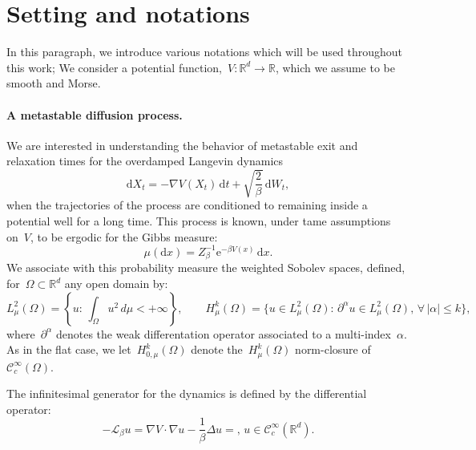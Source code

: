 \documentclass[10pt]{article}
\newcommand{\cL}{\mathcal{L}}
\renewcommand{\d}{\mathrm{d}}
\newcommand{\e}{\mathrm{e}}
\newcommand{\R}{\mathbb{R}}
\newcommand{\1}{\mathbbm 1}
\begin{document}
    \section{Setting and notations}
    \label{sec:notations}
    In this paragraph, we introduce various notations which will be used throughout this work;
    We consider a potential function,~$V:\R^d \to \R$, which we assume to be smooth and Morse.

    \paragraph{A metastable diffusion process.}
    We are interested in understanding the behavior of metastable exit and relaxation times for the overdamped Langevin dynamics
    \begin{equation}
        \label{eq:overdamped_langevin}
        \d X_t = -\nabla V(X_t)\,\d t + \sqrt{\frac2\beta}\, \d W_t,
    \end{equation}
    when the trajectories of the process are conditioned to remaining inside a potential well for a long time.
    This process is known, under tame assumptions on~$V$, to be ergodic for the Gibbs measure:
    \[\mu(\d x) = Z_\beta^{-1}\e^{-\beta V(x)}\,\d x.\]
    We associate with this probability measure the weighted Sobolev spaces, defined, for~$\Omega\subset \R^d$ any open domain by:
    \begin{equation}
        \label{eq:sobolev_spaces}
        L_\mu^2(\Omega) = \left\{u:\,\int_{\Omega} u^2 \,d\mu < +\infty\right\},\qquad H^{k}_\mu(\Omega) = \{u\in L^2_\mu(\Omega):\,\partial^{\alpha}u\in L^2_\mu(\Omega),\,\forall\, |\alpha|\leq k\},
    \end{equation}
    where~$\partial^\alpha$ denotes the weak differentation operator associated to a multi-index~$\alpha$. As in the flat case, we let~$H_{0,\mu}^k(\Omega)$ denote the~$H_\mu^k(\Omega)$ norm-closure of~$\mathcal C^\infty_c(\Omega)$.

    The infinitesimal generator for the dynamics is defined by the differential operator:
    \begin{equation}
        \label{eq:generator}
        -\cL_\beta u = \nabla V \cdot \nabla u - \frac1\beta \Delta u=,\, u \in \mathcal C^\infty_c(\R^d).
    \end{equation}
\end{document}
